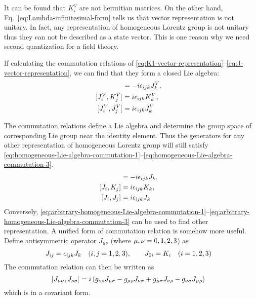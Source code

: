 It can be found that $K_i^V$ are not hermitian matrices. On the other hand, Eq.~\eqref{eq:Lambda-infinitesimal-form} tells us that vector representation is not unitary. In fact, any representation of homogeneous Lorentz group is not unitary thus they can not be described as a state vector. This is one reason why we need second quantization for a field theory.

If calculating the commutation relations of \eqref{eq:K1-vector-representation}--\eqref{eq:J-vector-representation}, we can find that they form a closed Lie algebra:
\begin{align}
  [K_i^V,K_j^V] &= -i \e_{ijk} J_k^V, \label{eq:homogeneous-Lie-algebra-commutation-1} \\
  [J_i^V,K_j^V] &=  i \e_{ijk} K_k^V, \label{eq:homogeneous-Lie-algebra-commutation-2} \\
  [J_i^V,J_j^V] &=  i \e_{ijk} J_k^V  \label{eq:homogeneous-Lie-algebra-commutation-3}
\end{align}

The commutation relations define a Lie algebra and determine the group space of corresponding Lie group near the identity element. Thus the generators for any other representation of homogeneous Lorentz group will still satisfy \eqref{eq:homogeneous-Lie-algebra-commutation-1}--\eqref{eq:homogeneous-Lie-algebra-commutation-3}.
\begin{align}
  [K_i,K_j] &= -i \e_{ijk} J_k, \label{eq:arbitrary-homogeneous-Lie-algebra-commutation-1} \\
  [J_i,K_j] &=  i \e_{ijk} K_k, \label{eq:arbitrary-homogeneous-Lie-algebra-commutation-2} \\
  [J_i,J_j] &=  i \e_{ijk} J_k  \label{eq:arbitrary-homogeneous-Lie-algebra-commutation-3}
\end{align}
Conversely, \eqref{eq:arbitrary-homogeneous-Lie-algebra-commutation-1}--\eqref{eq:arbitrary-homogeneous-Lie-algebra-commutation-3} can be used to find other representation. A unified form of commutation relation is somehow more useful. Define antisymmetric operator $J_{\mu\nu}$ (where $\mu,\nu = 0,1,2,3$) as
\begin{equation} \label{eq:redefine-Lorentz-generator-operators}
  J_{ij} = \epsilon_{ijk}J_k \quad (i,j = 1,2,3), \qquad
  J_{0i} = K_i \quad (i = 1,2,3)
\end{equation}
The commutation relation can then be written as
\begin{equation} \label{eq:Lorentz-operator-commutation-covariant-form}
  \comm{J_{\mu\nu}}{J_{\rh\s}} =
  i \, (  g_{\n\rh}J_{\m\s} - g_{\m\rh}J_{\n\s}
        + g_{\m\s}J_{\n\rh} - g_{\n\s}J_{\m\rh})
\end{equation}
which is in a covariant form.

